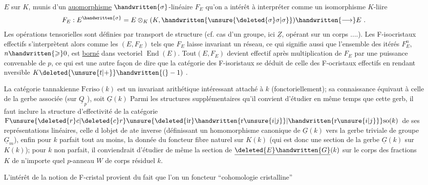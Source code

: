 
$E$ sur $K$, munis d'un  \uline{auomorphisme} $\handwritten{\sigma}$-linéaire $F_E$\handwritten{;}  qu'on a intérêt à interpréter comme un isomorphisme $K$-liire
\[
F_E : E^{\handwritten{\sigma}} = E\otimes_K(K,\handwritten{\unsure{\deleted{\sigma}\sigma|\sigma}})\handwritten{\longrightarrow} E\ .
\]
Les opérations tensorielles sont définies par transport de structure (cf. cas d'un groupe, ici $\underline{Z}$, opérant sur un corps ....). Les F-isocristaux effectifs s'interprètent alors comme les $(E,F_E)$ tels que $F_E$ laisse invariant un réseau, ce qui signifie aussi que l'ensemble des itérés $F_E^n$, $n\handwritten{\geqslant}0$, est \uline{borné} dans  vectoriel $\operatorname{End}(E)$. Tout$(E,F_E)$ devient  effectif après multiplication de $F_E$ par une puissance convenable de $p$, ce qui est une autre façon de dire que la catégorie des F-isoristaux se déduit de celle des F-ocristaux effectifs  en rendant nversible $K\deleted{\unsure{t|+}}\handwritten{(}-1)$ .

 La catégorie tannakienne $\mathrm{Fcriso}(k)$ est un invariant arithétique intéressant attaché à $k$ (fonctoriellement); sa  connaissance équivaut à celle de la gerbe associée (sur $\underline{Q}_p$), soit $\underline{G}(k)$ Parmi les structures supplémentaires qu'il convient d'étudier en même temps que cette gerb, il faut inclure la structure d'effectivité de la catégorie $\mathrm{F}\unsure{\deleted{r}c|\deleted{c}r}\unsure{\deleted{\mathrm{ir}}\handwritten{\mathrm{r}\unsure{i|j}}|\handwritten{\mathrm{r}\unsure{i|j}}}\mathrm{so}(k)$ de ses représentations linéaires, celle d lobjet de ate inverse (définissant un homomorphisme canonique de $\underline{G}(k)$ vers la gerbe triviale de groupe $\underline{G}_m$), enfin pour $k$ parfait tout au moins, la donnée du foncteur fibre naturel sur $K(k)$ (qui est donc une section de la gerbe $\underline{G}(k)$ sur $K(k)$); pour $k$ non parfait, il conviendrait  d'étudier de même la section de $\underline{\deleted{E}\handwritten{G}}(k)$ sur le corps des fractions $K$ de n'importe quel $p$-anneau $W$ de corps résiduel $k$.

L'intérêt de la notion de F-cristal  provient du fait que l'on  un foncteur ``cohomologie cristalline''
